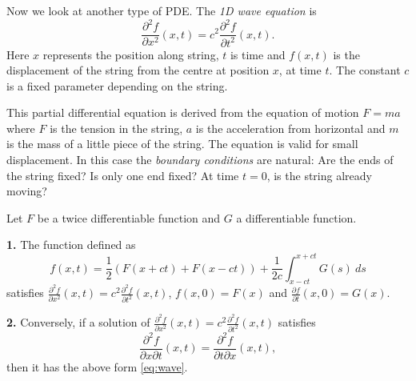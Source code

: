 Now we look at another type of PDE.
The \emph{1D wave equation} is
\[
    \frac{\partial^2 f}{\partial x^2}(x,t) = c^2  \frac{\partial^2 f}{\partial t^2}(x,t).
\]
Here \(x\) represents the position along string,
\(t\) is time and \(f(x,t)\) is the displacement of the string from the centre at position \(x\), at time \(t\).
The constant \(c\) is a fixed parameter depending on the string.

This partial differential equation is derived from the equation of motion \(F = m a\) where \(F\) is the tension in the string, \(a\) is the acceleration from horizontal and \(m\) is the mass of a little piece of the string.
The equation is valid for small displacement.
In this case the \emph{boundary conditions} are natural: Are the ends of the string fixed? Is only one end fixed? At time \(t=0\), is the string already moving?

\begin{theorem}
    Let \(F\) be a twice differentiable function and \(G\) a differentiable function.

    \noindent
    \textbf{1.} The function defined as
    \begin{equation}
        \label{eq:wave}
        f(x,t) = \frac{1}{2}(F(x+ct) + F(x-ct)) + \frac{1}{2c} \int_{x-ct}^{x+ct} G(s) \ ds
    \end{equation}
    satisfies \(   \frac{\partial^2 f}{\partial x^2}(x,t) = c^2  \frac{\partial^2 f}{\partial t^2}(x,t) \),
    \(f(x,0) = F(x)\)
    and \(\frac{\partial f}{\partial t}(x,0) = G(x)\).

    \noindent
    \textbf{2.} Conversely, if a solution of  \(   \frac{\partial^2 f}{\partial x^2}(x,t) = c^2  \frac{\partial^2 f}{\partial t^2}(x,t) \) satisfies
    \[\frac{\partial^2 f}{\partial x \partial t}(x,t) = \frac{\partial^2 f}{\partial t \partial x}(x,t),\]
    then it has the above form \eqref{eq:wave}.
\end{theorem}


